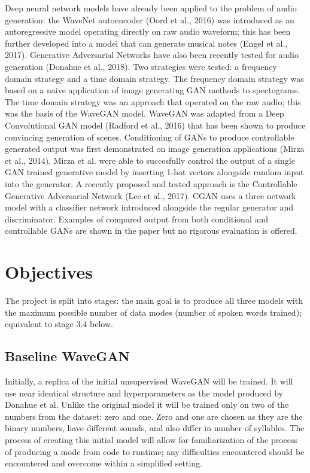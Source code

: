\documentclass[titlepage]{article}
\begin{document}
Deep neural network models have already been applied to the problem of audio generation: the WaveNet autoencoder (Oord et al., 2016) was introduced as an autoregressive model operating directly on raw audio waveform; this has been further developed into a model that can generate musical notes (Engel et al., 2017).
\newline
\newline
Generative Adversarial Networks have also been recently tested for audio generation (Donahue et al., 2018).
Two strategies were tested: a frequency domain strategy and a time domain strategy.
The frequency domain strategy was based on a naive application of image generating GAN methods to spectograms.
The time domain strategy was an approach that operated on the raw audio; this was the basis of the WaveGAN model.
WaveGAN was adapted from a Deep Convolutional GAN model (Radford et al., 2016) that has been shown to produce convincing generation of scenes.
\newline
\newline
Conditioning of GANs to produce controllable generated output was first demonstrated on image generation applications (Mirza et al., 2014).
Mirza et al. were able to succesfully control the output of a single GAN trained generative model by inserting 1-hot vectors alongside random input into the generator.
\newline
\newline
A recently proposed and tested approach is the Controllable Generative Adversarial Network (Lee et al., 2017).
CGAN uses a three network model with a classifier network introduced alongside the regular generator and discriminator.
Examples of compared output from both conditional and controllable GANs are shown in the paper but no rigorous evaluation is offered.

\section{Objectives}

The project is split into stages: the main goal is to produce all three models with the maximum possible number of data modes (number of spoken words trained); equivalent to stage 3.4 below.

\subsection{Baseline WaveGAN}

Initially, a replica of the initial unsupervised WaveGAN will be trained.
It will use near identical structure and hyperparameters as the model produced by Donahue et al.
Unlike the original model it will be trained only on two of the numbers from the dataset: zero and one.
Zero and one are chosen as they are the binary numbers, have different sounds, and also differ in number of syllables.
\newline
\newline
The process of creating this initial model will allow for familiarization of the process of producing a mode from code to runtime; any difficulties encountered should be encountered and overcome within a simplified setting. 
\end{document}
